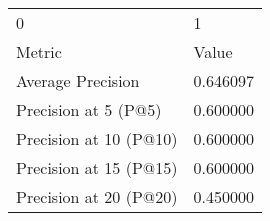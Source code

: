 \begin{tabular}{ll}
0 & 1 \\
Metric & Value \\
Average Precision & 0.646097 \\
Precision at 5 (P@5) & 0.600000 \\
Precision at 10 (P@10) & 0.600000 \\
Precision at 15 (P@15) & 0.600000 \\
Precision at 20 (P@20) & 0.450000 \\
\end{tabular}
